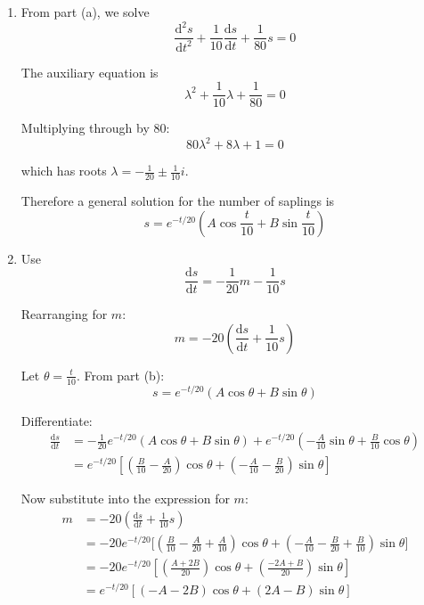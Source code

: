 \documentclass[leqno]{article}
\begin{document}
\begin{enumerate}[
  label=\textbf{\arabic*.},
  leftmargin=*,
  topsep=0pt,
  partopsep=0pt,
  parsep=0pt
]
\begin{djsSolution}
\begin{enumerate}[label=\textbf{(\alph*)}]
  Rearranging:
  \[
  \frac{\mathrm{d}^2s}{\mathrm{d}t^2}+\frac{1}{10}\frac{\mathrm{d}s}{\mathrm{d}t}+\frac{1}{80}s=0
  \]

  as required.

  \item From part (a), we solve
  \[
  \frac{\mathrm{d}^2s}{\mathrm{d}t^2}+\frac{1}{10}\frac{\mathrm{d}s}{\mathrm{d}t}+\frac{1}{80}s=0
  \]

  The auxiliary equation is
  \[
  \lambda^2+\frac{1}{10}\lambda+\frac{1}{80}=0
  \]

  Multiplying through by $80$:
  \[
  80\lambda^2+8\lambda+1=0
  \]

  which has roots $\lambda=-\frac{1}{20}\pm\frac{1}{10}i$.

  Therefore a general solution for the number of saplings is
  \[
  s=e^{-t/20}\left(A\cos\frac{t}{10}+B\sin\frac{t}{10}\right)
  \]

  \item Use
  \[
  \frac{\mathrm{d}s}{\mathrm{d}t}=-\frac{1}{20}m-\frac{1}{10}s
  \]

  Rearranging for $m$:
  \[
  m=-20\left(\frac{\mathrm{d}s}{\mathrm{d}t}+\frac{1}{10}s\right)
  \]

  Let $\theta=\frac{t}{10}$. From part (b):
  \[
  s=e^{-t/20}(A\cos\theta+B\sin\theta)
  \]

  Differentiate:
  \begin{align*}
  \frac{\mathrm{d}s}{\mathrm{d}t}
  &= -\frac{1}{20}e^{-t/20}(A\cos\theta+B\sin\theta)
   +e^{-t/20}\left(-\frac{A}{10}\sin\theta+\frac{B}{10}\cos\theta\right) \\
  &= e^{-t/20}\left[\left(\frac{B}{10}-\frac{A}{20}\right)\cos\theta
  +\left(-\frac{A}{10}-\frac{B}{20}\right)\sin\theta\right]
  \end{align*}

  Now substitute into the expression for $m$:
  \begin{align*}
  m
  &= -20\left(\frac{\mathrm{d}s}{\mathrm{d}t}+\frac{1}{10}s\right) \\
  &= -20e^{-t/20}\Bigg[\left(\frac{B}{10}-\frac{A}{20}+\frac{A}{10}\right)\cos\theta
  +\left(-\frac{A}{10}-\frac{B}{20}+\frac{B}{10}\right)\sin\theta\Bigg] \\
  &= -20e^{-t/20}\left[\left(\frac{A+2B}{20}\right)\cos\theta
  +\left(\frac{-2A+B}{20}\right)\sin\theta\right] \\
  &= e^{-t/20}\left[(-A-2B)\cos\theta+(2A-B)\sin\theta\right]
  \end{align*}


\end{enumerate}
\end{djsSolution}
\end{enumerate}
\end{document}
